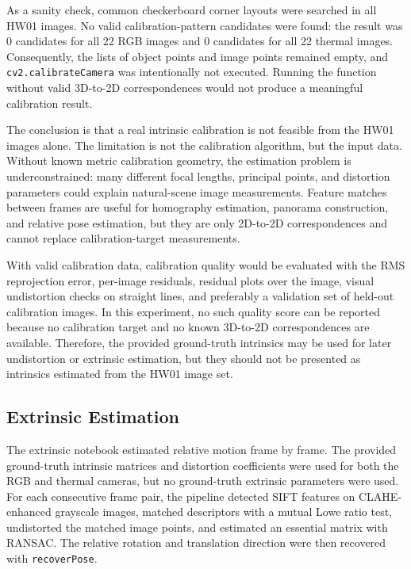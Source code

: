 As a sanity check, common checkerboard corner layouts were searched in all HW01
images. No valid calibration-pattern candidates were found: the result was
\(0\) candidates for all 22 RGB images and \(0\) candidates for all 22 thermal
images. Consequently, the lists of object points and image points remained
empty, and \texttt{cv2.calibrateCamera} was intentionally not executed. Running
the function without valid 3D-to-2D correspondences would not produce a
meaningful calibration result.

The conclusion is that a real intrinsic calibration is not feasible from the
HW01 images alone. The limitation is not the calibration algorithm, but the
input data. Without known metric calibration geometry, the estimation problem is
underconstrained: many different focal lengths, principal points, and
distortion parameters could explain natural-scene image measurements. Feature
matches between frames are useful for homography estimation, panorama
construction, and relative pose estimation, but they are only 2D-to-2D
correspondences and cannot replace calibration-target measurements.

With valid calibration data, calibration quality would be evaluated with the
RMS reprojection error, per-image residuals, residual plots over the image,
visual undistortion checks on straight lines, and preferably a validation set of
held-out calibration images. In this experiment, no such quality score can be
reported because no calibration target and no known 3D-to-2D correspondences
are available. Therefore, the provided ground-truth intrinsics may be used for
later undistortion or extrinsic estimation, but they should not be presented as
intrinsics estimated from the HW01 image set.

\subsection{Extrinsic Estimation}

The extrinsic notebook estimated relative motion frame by frame. The provided
ground-truth intrinsic matrices and distortion coefficients were used for both
the RGB and thermal cameras, but no ground-truth extrinsic parameters were used.
For each consecutive frame pair, the pipeline detected SIFT features on
CLAHE-enhanced grayscale images, matched descriptors with a mutual Lowe ratio
test, undistorted the matched image points, and estimated an essential matrix
with RANSAC. The relative rotation and translation direction were then recovered
with \texttt{recoverPose}.

